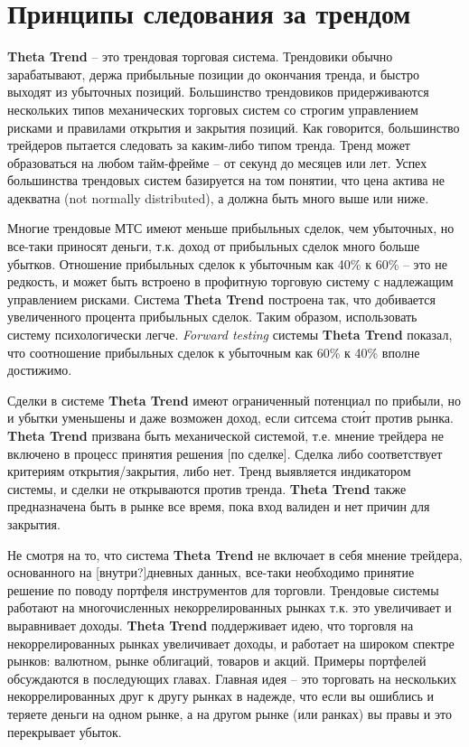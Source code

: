 \documentclass[12pt,DIV=18]{scrartcl}
\begin{document}
\bigskip

\section{Принципы следования за трендом}
\label{chapter2}

\bigskip

\textbf{Theta Trend} -- это трендовая торговая система. Трендовики обычно зарабатывают, держа прибыльные позиции до окончания тренда, и быстро выходят из убыточных позиций. Большинство трендовиков придерживаются нескольких типов механических торговых систем со строгим управлением рисками и правилами открытия и закрытия позиций. Как говорится, большинство трейдеров пытается следовать за каким-либо типом  тренда. Тренд может образоваться на любом тайм-фрейме -- от секунд до месяцев или лет. Успех большинства трендовых систем базируется на том понятии, что цена актива не адекватна (not normally 
distributed), а должна быть много выше или ниже.

\bigskip

Многие трендовые МТС имеют меньше прибыльных сделок, чем убыточных, но все-таки приносят деньги, т.к. доход от прибыльных сделок много больше убытков. Отношение прибыльных сделок к убыточным как 40\% к 60\% -- это не редкость, и может быть встроено в профитную торговую систему с надлежащим управлением рисками. Система \textbf{Theta Trend} построена так, что добивается увеличенного процента прибыльных сделок. Таким образом, использовать систему психологически легче. \textit{Forward testing} системы \textbf{Theta Trend} показал, что соотношение прибыльных сделок к убыточным как 60\% к 40\% вполне достижимо.

\bigskip

Сделки в системе \textbf{Theta Trend} имеют ограниченный потенциал по прибыли, но и убытки уменьшены и даже возможен доход, если ситсема сто\'{и}т против рынка. \textbf{Theta Trend} призвана быть механической системой, т.е. мнение трейдера не включено в процесс принятия решения [по сделке]. Сделка либо соответствует критериям открытия/закрытия, либо нет. Тренд выявляется индикатором системы, и сделки не открываются против тренда. \textbf{Theta Trend} также предназначена быть в рынке все время, пока вход валиден и нет причин для закрытия.

\bigskip

Не смотря на то, что система \textbf{Theta Trend} не включает в себя мнение трейдера, основанного на [внутри?]дневных данных, все-таки необходимо принятие решение по поводу портфеля инструментов для торговли. Трендовые системы работают на многочисленных некоррелированных рынках т.к. это увеличивает и выравнивает доходы. \textbf{Theta Trend} поддерживает идею, что торговля на некоррелированных рынках увеличивает доходы, и работает на широком спектре рынков: валютном, рынке облигаций, товаров и акций. Примеры портфелей обсуждаются в последующих главах. Главная идея -- это торговать на нескольких некоррелированных друг к другу рынках в надежде, что если вы ошиблись и теряете деньги на одном рынке, а на другом рынке (или ранках) вы правы и это перекрывает убыток.
\end{document}
